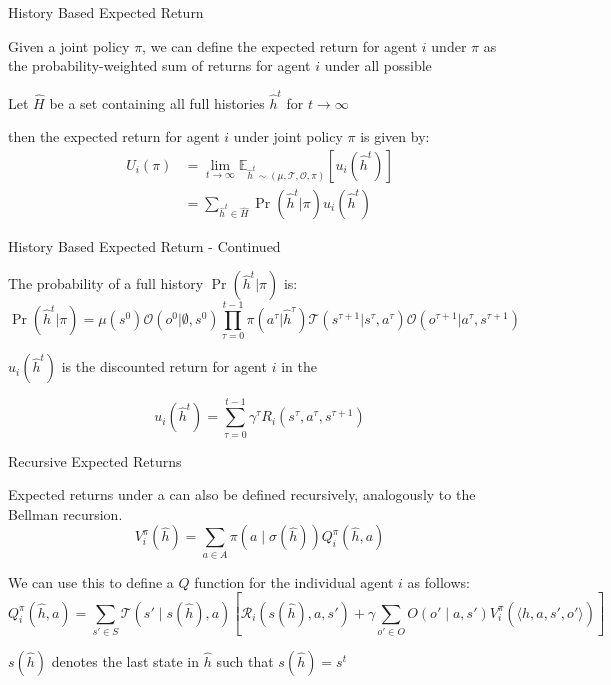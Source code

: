 \begin{frame}{History Based Expected Return}

    Given a joint policy \(\pi\), we can define the expected return for agent \(i\) under \(\pi\) as the probability-weighted sum of returns for agent \(i\) under all possible 
    \vspace{5pt}
    \blist
        \item Let $\hat{H}$ be a set containing all full histories $\hat{h}^t$ for $t \to \infty$
        \item then the expected return for agent $i$ under joint policy \(\pi\) is given by:
    \elist
    \vspace{0pt}
    \begin{align*}
         U_i(\pi) &= \lim_{t \to \infty} \mathbb{E}_{\hat{h}^t \sim (\mu, \mathcal{T}, \mathcal{O}, \pi)}\left[u_{i}(\hat{h}^t) \right] \\[5pt]
         &= \sum_{\hat{h}^t \in \hat{H}} \Pr(\hat{h}^t|\pi)u_i(\hat{h}^t)
    \end{align*}


        
\end{frame}

\begin{frame}{History Based Expected Return - Continued}

    The probability of a full history $\Pr(\hat{h}^t|\pi)$ is:
    \vspace{2pt}
    \[
        \Pr(\hat{h}^t | \pi) = \mu(s^0)\mathcal{O}(o^0 | \emptyset, s^0) \prod_{\tau=0}^{t-1} \pi(a^\tau | \hat{h}^\tau)\mathcal{T}(s^{\tau+1} | s^\tau, a^\tau)\mathcal{O}(o^{\tau+1} | a^\tau, s^{\tau+1})
    \]

    \(u_i(\hat{h}^t)\) is the discounted return for agent \(i\) in the 

    \[
        u_i(\hat{h}^t) = \sum_{\tau=0}^{t-1} \gamma^\tau R_i(s^\tau, a^\tau, s^{\tau+1})
    \]
    
\end{frame}

\begin{frame}{Recursive Expected Returns}

    Expected returns under a  can also be defined recursively, analogously to the Bellman recursion. 
        \vspace{2pt}
    \[
        V^{\pi}_i(\hat{h}) = \sum_{a \in A} \pi(a \mid \sigma(\hat{h})) Q^{\pi}_i (\hat{h}, a)
    \]

    We can use this to define a \(Q\) function for the individual agent \(i\) as follows:
    \vspace{2pt}
    \[
        Q^{\pi}_i(\hat{h}, a) = \sum_{s' \in S} \mathcal{T}(s' \mid s(\hat{h}), a) \left[ \mathcal{R}_i(s(\hat{h}), a, s') + \gamma \sum_{o' \in O} O(o' \mid a, s') V^{\pi}_i(\langle \hat{h}, a, s', o'\rangle) \right]
    \]

    \blist
        \item \(s(\hat{h})\) denotes the last state in \(\hat{h}\) such that \(s(\hat{h}) = s^t\)
    \elist
    
\end{frame}


